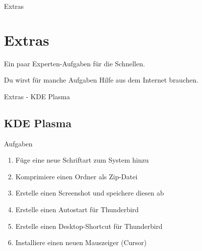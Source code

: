 
\begin{frame}{Extras}
    \section{Extras}\label{sec:extras}

    Ein paar Experten-Aufgaben für die Schnellen.

    Du wirst für manche Aufgaben Hilfe aus dem Internet brauchen.

\end{frame}

\begin{frame}{Extras - KDE Plasma}
    \subsection{KDE Plasma}\label{subsec:kde plasma}

    \begin{alertblock}{Aufgaben}
        \begin{enumerate}
            \item Füge eine neue Schriftart zum System hinzu
            \item Komprimiere einen Ordner als Zip-Datei
            \item Erstelle einen Screenshot und speichere diesen ab
            \item Erstelle einen Autostart für Thunderbird
            \item Erstelle einen Desktop-Shortcut für Thunderbird
            \item Installiere einen neuen Mauszeiger (Cursor)
        \end{enumerate}

    \end{alertblock}

\end{frame}


